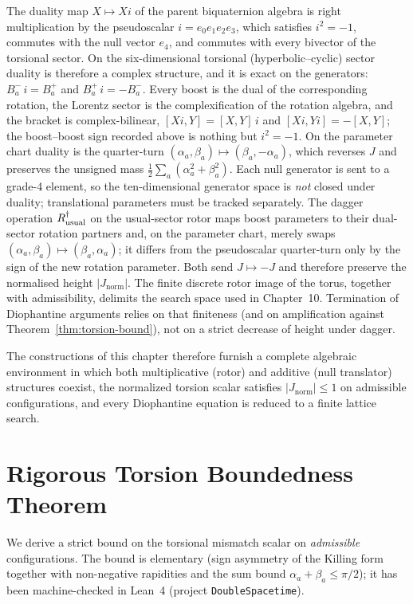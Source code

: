 \documentclass[a4paper]{article}
\theoremstyle{definition}
\theoremstyle{remark}
\newcommand{\Jnorm}{J_{\mathrm{norm}}}
\begin{document}
The duality map \( X \mapsto Xi \) of the parent biquaternion algebra is right multiplication by the pseudoscalar \( i=e_0e_1e_2e_3 \), which satisfies \( i^2=-1 \), commutes with the null vector \( e_4 \), and commutes with every bivector of the torsional sector. On the six-dimensional torsional (hyperbolic--cyclic) sector duality is therefore a complex structure, and it is exact on the generators: \( B^-_a\,i = B^+_a \) and \( B^+_a\,i=-B^-_a \). Every boost is the dual of the corresponding rotation, the Lorentz sector is the complexification of the rotation algebra, and the bracket is complex-bilinear, \([Xi,Y]=[X,Y]\,i\) and \([Xi,Yi]=-[X,Y]\); the boost--boost sign recorded above is nothing but \( i^2=-1 \). On the parameter chart duality is the quarter-turn \((\alpha_a,\beta_a)\mapsto(\beta_a,-\alpha_a)\), which reverses \(J\) and preserves the unsigned mass \(\tfrac12\sum_a(\alpha_a^2+\beta_a^2)\). Each null generator is sent to a grade-4 element, so the ten-dimensional generator space is \emph{not} closed under duality; translational parameters must be tracked separately. The dagger operation \( R_{\rm usual}^\dagger \) on the usual-sector rotor maps boost parameters to their dual-sector rotation partners and, on the parameter chart, merely swaps \((\alpha_a,\beta_a)\mapsto(\beta_a,\alpha_a)\); it differs from the pseudoscalar quarter-turn only by the sign of the new rotation parameter. Both send \(J\mapsto -J\) and therefore preserve the normalised height \(|\Jnorm|\). The finite discrete rotor image of the torus, together with admissibility, delimits the search space used in Chapter~10. Termination of Diophantine arguments relies on that finiteness (and on amplification against Theorem~\ref{thm:torsion-bound}), not on a strict decrease of height under dagger.

The constructions of this chapter therefore furnish a complete algebraic environment in which both multiplicative (rotor) and additive (null translator) structures coexist, the normalized torsion scalar satisfies \(|\Jnorm|\leq 1\) on admissible configurations, and every Diophantine equation is reduced to a finite lattice search.

\section{Rigorous Torsion Boundedness Theorem}

We derive a strict bound on the torsional mismatch scalar on \emph{admissible} configurations. The bound is elementary (sign asymmetry of the Killing form together with non-negative rapidities and the sum bound \(\alpha_a+\beta_a\le\pi/2\)); it has been machine-checked in Lean~4 (project \texttt{DoubleSpacetime}).
\end{document}
